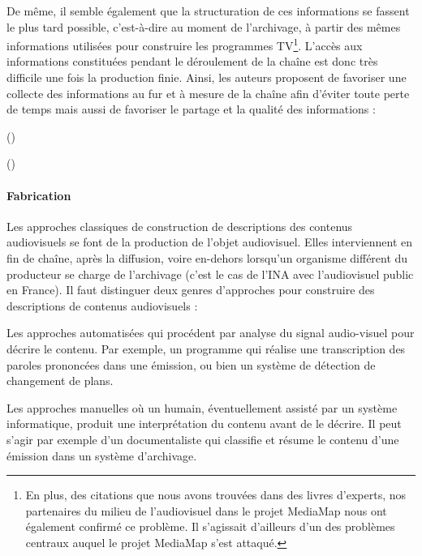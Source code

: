 De même, il semble également que la structuration de ces informations se fassent le plus tard possible, c'est-à-dire au moment de l'archivage, à partir des mêmes informations utilisées pour construire les programmes TV\footnote{En plus, des citations que nous avons trouvées dans des livres d'experts, nos partenaires du milieu de l'audiovisuel dans le projet MediaMap nous ont également confirmé ce problème. Il s'agissait d'ailleurs d'un des problèmes centraux auquel le projet MediaMap s'est attaqué.}.
L'accès aux informations constituées pendant le déroulement de la chaîne est donc très difficile une fois la production finie.
Ainsi, les auteurs proposent de favoriser une collecte des informations au fur et à mesure de la chaîne afin d'éviter toute perte de temps mais aussi de favoriser le partage et la qualité des informations : 

 (\cite[p.23, Metadata in the Workflow]{Austerberry2004})

 (\cite{Rayers2002})





\paragraph{Fabrication }
Les approches classiques de construction de descriptions des contenus audiovisuels se font  de la production de l'objet audiovisuel. 
Elles interviennent en fin de chaîne, après la diffusion, voire en-dehors lorsqu'un organisme différent du producteur se charge de l'archivage (c'est le cas de l'INA avec l'audiovisuel public en France). 
Il faut distinguer deux genres d'approches pour construire des descriptions de contenus audiovisuels : 
\begin{liste}
	\item Les approches automatisées qui procédent par analyse du signal audio-visuel pour décrire le contenu.
	Par exemple, un programme qui réalise une transcription des paroles prononcées dans une émission, ou bien un système de détection de changement de plans. 

	\item Les approches manuelles où un humain, éventuellement assisté par un système informatique, produit une interprétation du contenu avant de le décrire. 
	Il peut s'agir par exemple d'un documentaliste qui classifie et résume le contenu d'une émission dans un système d'archivage.
\end{liste}

